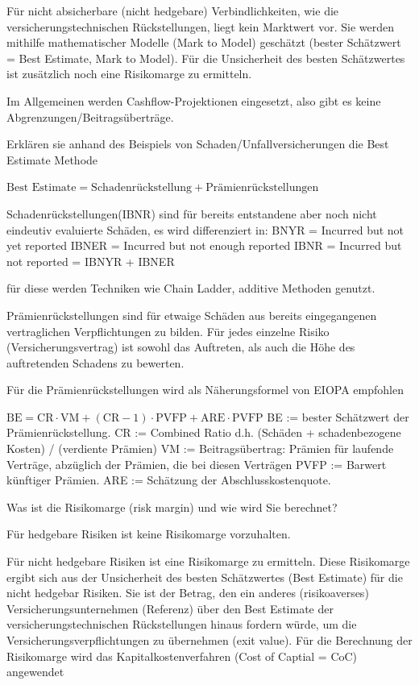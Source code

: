 Für nicht absicherbare (nicht hedgebare) Verbindlichkeiten, wie die versicherungstechnischen
Rückstellungen, liegt kein Marktwert vor.
Sie werden mithilfe mathematischer Modelle (Mark to Model) geschätzt (bester Schätzwert = Best Estimate, Mark to Model).
Für die Unsicherheit des besten Schätzwertes ist zusätzlich noch eine Risikomarge zu ermitteln.

Im Allgemeinen werden Cashflow-Projektionen eingesetzt, also gibt es keine Abgrenzungen/Beitragsüberträge.


Erklären sie anhand des Beispiels von Schaden/Unfallversicherungen die Best Estimate Methode

\(\text{Best Estimate} = \text{Schadenrückstellung} + \text{Prämienrückstellungen} \)

Schadenrückstellungen(IBNR) sind für bereits entstandene aber noch nicht eindeutiv evaluierte Schäden,
es wird differenziert in:
BNYR = Incurred but not yet reported
IBNER = Incurred but not enough reported
IBNR = Incurred but not reported = IBNYR + IBNER

für diese werden Techniken wie Chain Ladder, additive Methoden genutzt.

Prämienrückstellungen sind für etwaige Schäden aus bereits
eingegangenen vertraglichen Verpflichtungen zu bilden.
Für jedes einzelne Risiko (Versicherungsvertrag) ist sowohl das
Auftreten, als auch die Höhe des auftretenden Schadens zu bewerten.

Für die Prämienrückstellungen wird als Näherungsformel von EIOPA empfohlen

\( \text{BE} = \text{CR}\cdot\text{VM} + (\text{CR} -1)\cdot \text{PVFP} + \text{ARE}\cdot \text{PVFP} \)
BE := bester Schätzwert der Prämienrückstellung.
CR := Combined Ratio d.h. (Schäden + schadenbezogene Kosten) / (verdiente Prämien)
VM := Beitragsübertrag: Prämien für laufende Verträge, abzüglich der Prämien, die bei diesen Verträgen
PVFP := Barwert künftiger Prämien.
ARE := Schätzung der Abschlusskostenquote.


Was ist die Risikomarge (risk margin) und wie wird Sie berechnet?

Für hedgebare Risiken ist keine Risikomarge vorzuhalten.

Für nicht hedgebare Risiken ist eine Risikomarge zu ermitteln. Diese Risikomarge ergibt sich aus
der Unsicherheit des besten Schätzwertes (Best Estimate) für die nicht hedgebar Risiken.
Sie ist der Betrag, den ein anderes (risikoaverses) Versicherungsunternehmen (Referenz) über den Best Estimate 
der versicherungstechnischen Rückstellungen hinaus fordern
würde, um die Versicherungsverpflichtungen zu übernehmen (exit value). Für die Berechnung
der Risikomarge wird das Kapitalkostenverfahren (Cost of Captial = CoC) angewendet

